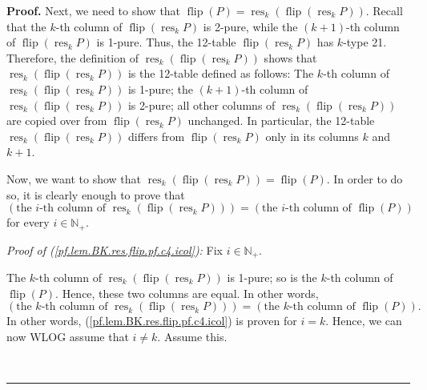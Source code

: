 \documentclass[numbers=enddot,12pt,final,onecolumn,notitlepage]{scrartcl}%
\theoremstyle{definition}
\newenvironment{proof}[1][Proof]{\noindent\textbf{#1.} }{\ \rule{0.5em}{0.5em}}
\newenvironment{verlong}{}{}
\begin{document}
\begin{verlong}
\begin{proof}
Next, we need to show that $\operatorname*{flip}\left(  P\right)
=\operatorname*{res}\nolimits_{k}\left(  \operatorname*{flip}\left(
\operatorname*{res}\nolimits_{k}P\right)  \right)  $. Recall that the $k$-th
column of $\operatorname*{flip}\left(  \operatorname*{res}\nolimits_{k}%
P\right)  $ is 2-pure, while the $\left(  k+1\right)  $-th column of
$\operatorname*{flip}\left(  \operatorname*{res}\nolimits_{k}P\right)  $ is
1-pure. Thus, the 12-table $\operatorname*{flip}\left(  \operatorname*{res}%
\nolimits_{k}P\right)  $ has $k$-type 21. Therefore, the definition of
$\operatorname*{res}\nolimits_{k}\left(  \operatorname*{flip}\left(
\operatorname*{res}\nolimits_{k}P\right)  \right)  $ shows that
$\operatorname*{res}\nolimits_{k}\left(  \operatorname*{flip}\left(
\operatorname*{res}\nolimits_{k}P\right)  \right)  $ is the 12-table defined
as follows: The $k$-th column of $\operatorname*{res}_{k}\left(
\operatorname*{flip}\left(  \operatorname*{res}\nolimits_{k}P\right)  \right)
$ is 1-pure; the $\left(  k+1\right)  $-th column of $\operatorname*{res}%
\nolimits_{k}\left(  \operatorname*{flip}\left(  \operatorname*{res}%
\nolimits_{k}P\right)  \right)  $ is 2-pure; all other columns of
$\operatorname*{res}\nolimits_{k}\left(  \operatorname*{flip}\left(
\operatorname*{res}\nolimits_{k}P\right)  \right)  $ are copied over from
$\operatorname*{flip}\left(  \operatorname*{res}\nolimits_{k}P\right)  $
unchanged. In particular, the 12-table $\operatorname*{res}\nolimits_{k}%
\left(  \operatorname*{flip}\left(  \operatorname*{res}\nolimits_{k}P\right)
\right)  $ differs from $\operatorname*{flip}\left(  \operatorname*{res}%
\nolimits_{k}P\right)  $ only in its columns $k$ and $k+1$.

Now, we want to show that $\operatorname*{res}\nolimits_{k}\left(
\operatorname*{flip}\left(  \operatorname*{res}\nolimits_{k}P\right)  \right)
=\operatorname*{flip}\left(  P\right)  $. In order to do so, it is clearly
enough to prove that%
\begin{equation}
\left(  \text{the }i\text{-th column of }\operatorname*{res}\nolimits_{k}%
\left(  \operatorname*{flip}\left(  \operatorname*{res}\nolimits_{k}P\right)
\right)  \right)  =\left(  \text{the }i\text{-th column of }%
\operatorname*{flip}\left(  P\right)  \right)
\label{pf.lem.BK.res.flip.pf.c4.icol}%
\end{equation}
for every $i\in\mathbb{N}_{+}$.

\textit{Proof of (\ref{pf.lem.BK.res.flip.pf.c4.icol}):} Fix $i\in
\mathbb{N}_{+}$.

The $k$-th column of $\operatorname*{res}\nolimits_{k}\left(
\operatorname*{flip}\left(  \operatorname*{res}\nolimits_{k}P\right)  \right)
$ is 1-pure; so is the $k$-th column of $\operatorname*{flip}\left(  P\right)
$. Hence, these two columns are equal. In other words,%
\[
\left(  \text{the }k\text{-th column of }\operatorname*{res}\nolimits_{k}%
\left(  \operatorname*{flip}\left(  \operatorname*{res}\nolimits_{k}P\right)
\right)  \right)  =\left(  \text{the }k\text{-th column of }%
\operatorname*{flip}\left(  P\right)  \right)  .
\]
In other words, (\ref{pf.lem.BK.res.flip.pf.c4.icol}) is proven for $i=k$.
Hence, we can now WLOG assume that $i\neq k$. Assume this.


\end{proof}
\end{verlong}
\end{document}
